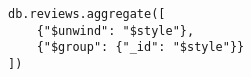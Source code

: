 



\begin{verbatim}
db.reviews.aggregate([
    {"$unwind": "$style"},
    {"$group": {"_id": "$style"}}
])
\end{verbatim}